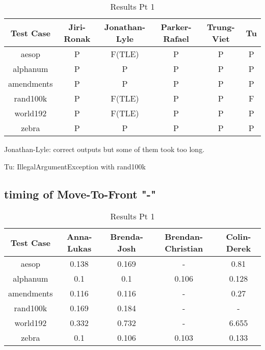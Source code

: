 \documentclass[12pt]{article}
\begin{document}
\begin{table}[ht]
\caption{Results Pt 1}%
\centering %
\begin{tabular}{c c c c c c}%
\hline \hline                        %
Test Case & Jiri-Ronak & Jonathan-Lyle & Parker-Rafael & Trung-Viet & Tu \\ [0.5ex]%
\hline                  %
aesop & P & F(TLE) & P & P & P\\  %
alphanum & P & P & P & P & P\\
amendments & P & P & P & P & P\\
rand100k & P & F(TLE) & P & P & F\\
world192 & P & F(TLE) & P & P & P\\
zebra & P & P & P & P & P\\
\hline                  %
\end{tabular}
\label{table:nonlin}
\end{table}

Jonathan-Lyle: correct outputs but some of them took too long.

Tu: IllegalArgumentException with rand100k

\newpage
\subsection{timing of Move-To-Front "-"}
\begin{table}[ht]
\caption{Results Pt 1}%
\centering %
\begin{tabular}{c c c c c}%
\hline \hline                        %
Test Case & Anna-Lukas & Brenda-Josh & Brendan-Christian & Colin-Derek \\ [0.5ex]%
\hline                  %
aesop & 0.138 & 0.169 & - & 0.81 \\  %
alphanum & 0.1 & 0.1 & 0.106 & 0.128 \\
amendments & 0.116 & 0.116 & - & 0.27 \\
rand100k & 0.169 & 0.184 & - & - \\
world192 & 0.332 & 0.732 & - & 6.655 \\
zebra & 0.1 & 0.106 & 0.103 & 0.133 \\
\hline                  %
\end{tabular}
\label{table:nonlin}
\end{table}
\end{document}
